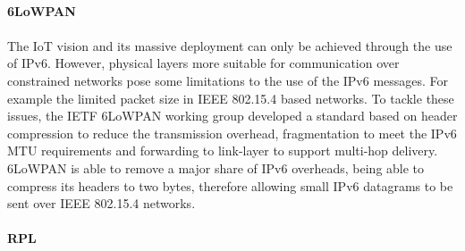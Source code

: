 \paragraph{\textbf{6LoWPAN}}
\paragraph{}
	The \ac{IoT} vision and its massive deployment can only be achieved through the use of IPv6. However, physical layers more suitable for communication over constrained networks pose some limitations to the use of the IPv6 messages. For example the limited packet size in IEEE 802.15.4 based networks. To tackle these issues, the \ac{IETF} 6LoWPAN working group developed a standard based on header compression to reduce the transmission overhead, fragmentation to meet the IPv6 \ac{MTU} requirements and forwarding to link-layer to support multi-hop delivery. \cite{Hui2008}
	6LoWPAN is able to remove a major share of IPv6 overheads, being able to compress its headers to two bytes, therefore allowing small IPv6 datagrams to be sent over IEEE 802.15.4 networks. 
	
\paragraph{\textbf{RPL}}
